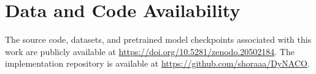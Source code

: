 \documentclass[journal]{IEEEtai}
\begin{document}


\section*{Data and Code Availability}
The source code, datasets, and pretrained model checkpoints associated with this work are publicly available at \url{https://doi.org/10.5281/zenodo.20502184}. The implementation repository is available at \url{https://github.com/shoraaa/DyNACO}.





\end{document}
